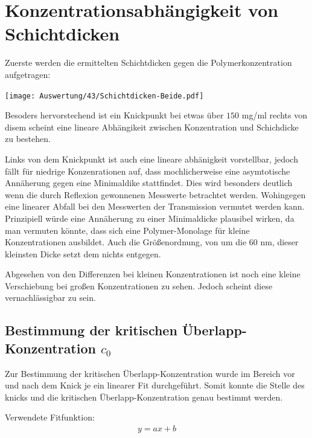 
\newpage
\section{Konzentrationsabhängigkeit von Schichtdicken}
\label{sec:konzDicke}
Zuerste werden die ermittelten Schichtdicken gegen die Polymerkonzentration aufgetragen:

\begin{center}
	\captionsetup{type=figure}
	\texttt{[image: Auswertung/43/Schichtdicken-Beide.pdf]}
\end{center}

Besoders hervorstechend ist ein Knickpunkt bei etwas über $150$ mg/ml rechts von disem scheint eine lineare Abhängikeit zwischen Konzentration und Schichdicke zu bestehen.

Links von dem Knickpunkt ist auch eine lineare abhänigkeit vorstellbar, jedoch fällt für niedrige Konzenrationen auf, dass mochlicherweise eine asymtotische Annäherung gegen eine Minimaldike stattfindet. Dies wird besonders deutlich wenn die durch Reflexion gewonnenen Messwerte betrachtet werden. Wohingegen eine linearer Abfall bei den Messwerten der Transmission vermutet werden kann. Prinzipiell würde eine Annäherung zu einer Minimaldicke plausibel wirken, da man vermuten könnte, dass sich eine Polymer-Monolage für kleine Konzentrationen ausbildet. Auch die Größenordnung, von um die $60$ nm, dieser kleinsten Dicke setzt dem nichts entgegen.

Abgesehen von den Differenzen bei kleinen Konzentrationen ist noch eine kleine Verschiebung bei großen Konzentrationen zu sehen. Jedoch scheint diese vernachlässigbar zu sein.


\newpage
\subsection{Bestimmung der kritischen Überlapp-Konzentration $c_0$}

Zur Bestimmung der kritischen Überlapp-Konzentration wurde im Bereich vor und nach dem Knick je ein linearer Fit durchgeführt. Somit konnte die Stelle des knicks und die kritischen Überlapp-Konzentration genau bestimmt werden.

Verwendete Fitfunktion:
\begin{gather}
	y = ax + b
\end{gather}

